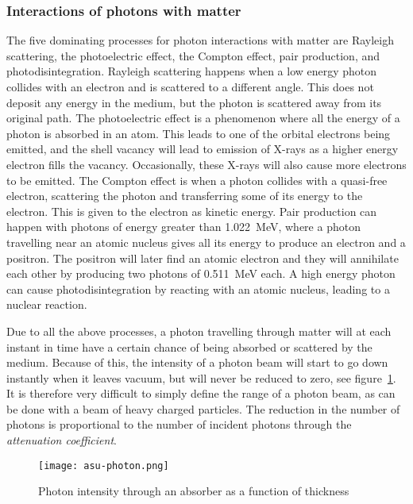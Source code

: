 \documentclass[../main/thesis.tex]{subfiles}
\begin{document}
\newpage
\subsubsection{Interactions of photons with matter}
\label{t-photon}
The five dominating processes for photon interactions with matter are Rayleigh scattering, the photoelectric effect, the Compton effect, pair production, and photodisintegration. Rayleigh scattering happens when a low energy photon collides with an electron and is scattered to a different angle. This does not deposit any energy in the medium, but the photon is scattered away from its original path. The photoelectric effect is a phenomenon where all the energy of a photon is absorbed in an atom. This leads to one of the orbital electrons being emitted, and the shell vacancy will lead to emission of X-rays as a higher energy electron fills the vacancy. Occasionally, these X-rays will also cause more electrons to be emitted. The Compton effect is when a photon collides with a quasi-free electron, scattering the photon and transferring some of its energy to the electron. This is given to the electron as kinetic energy. Pair production can happen with photons of energy greater than 1.022~MeV, where a photon travelling near an atomic nucleus gives all its energy to produce an electron and a positron. The positron will later find an atomic electron and they will annihilate each other by producing two photons of 0.511~MeV each. A high energy photon can cause photodisintegration by reacting with an atomic nucleus, leading to a nuclear reaction. \citep[chap. 2 $\&$ 5]{Khan} 

Due to all the above processes, a photon travelling through matter will at each instant in time have a certain chance of being absorbed or scattered by the medium. Because of this, the intensity of a photon beam will start to go down instantly when it leaves vacuum, but will never be reduced to zero, see figure~\ref{fig-photon}. It is therefore very difficult to simply define the range of a photon beam, as can be done with a beam of heavy charged particles. The reduction in the number of photons is proportional to the number of incident photons through the \textit{attenuation coefficient}. \citep[chap. 5]{Khan} 

\begin{figure}[h]
	\centering
	\texttt{[image: asu-photon.png]}%
	\caption{Photon intensity through an absorber as a function of thickness \citep{asu2000}}
	\label{fig-photon}
\end{figure}
\end{document}
